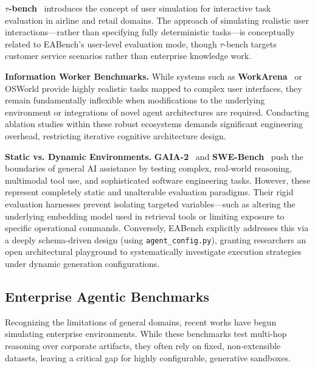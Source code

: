 \documentclass[journal,dvipsnames]{acmart}
\begin{document}
\textbf{$\tau$-bench}~\cite{yao2024taubench} introduces the concept of user
simulation for interactive task evaluation in airline and retail domains.  The
approach of simulating realistic user interactions---rather than specifying
fully deterministic tasks---is conceptually related to EABench's user-level
evaluation mode, though $\tau$-bench targets customer service scenarios rather
than enterprise knowledge work.

\textbf{Information Worker Benchmarks.} While systems such as \textbf{WorkArena}~\cite{drouin2024workarena} or OSWorld provide highly realistic tasks mapped to complex user interfaces, they remain fundamentally inflexible when modifications to the underlying environment or integrations of novel agent architectures are required. Conducting ablation studies within these robust ecosystems demands significant engineering overhead, restricting iterative cognitive architecture design.

\textbf{Static vs. Dynamic Environments.} \textbf{GAIA-2}~\cite{gaia2} and \textbf{SWE-Bench}~\cite{jimenez2024swebench} push the boundaries of general AI assistance by testing complex, real-world reasoning, multimodal tool use, and sophisticated software engineering tasks. However, these represent completely static and unalterable evaluation paradigms. Their rigid evaluation harnesses prevent isolating targeted variables---such as altering the underlying embedding model used in retrieval tools or limiting exposure to specific operational commands. Conversely, EABench explicitly addresses this via a deeply schema-driven design (using \texttt{agent\_config.py}), granting researchers an open architectural playground to systematically investigate execution strategies under dynamic generation configurations.

  \subsection{Enterprise Agentic Benchmarks}
  
Recognizing the limitations of general domains, recent works have begun simulating enterprise environments. While these benchmarks test multi-hop reasoning over corporate artifacts, they often rely on fixed, non-extensible datasets, leaving a critical gap for highly configurable, generative sandboxes.
    
\end{document}
